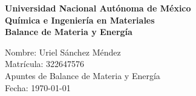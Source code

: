 \documentclass[12pt]{article}
\renewcommand{\headrulewidth}{0pt}
\newcommand{\activarEncabezado}[1]{%
  \fancyhead[L]{\small\textcolor{blueunam}{#1}}%
  \fancyhead[R]{\small\textcolor{blueunam}{\nouppercase{\leftmark}}}%
  \renewcommand{\headrulewidth}{0.4pt}%
  \renewcommand{\headrule}{\hbox to\headwidth{\color{blueunam}\leaders\hrule height \headrulewidth\hfill}}%
}
\begin{document}
\begin{titlepage}
\thispagestyle{empty}
\begin{center}
\vspace*{2cm}
\fontsize{14}{30}\selectfont\textbf{Universidad Nacional Autónoma de México} \\
\vspace{1cm}
\fontsize{14}{30}\selectfont\textbf{Química e Ingeniería en Materiales} \\
\vspace{1cm}
\fontsize{14}{30}\selectfont\textbf{Balance de Materia y Energía} \\
\end{center}
\vspace{2cm}
\begin{flushright}
    \fontsize{14}{30}\selectfont
        \hspace{2cm} Nombre: Uriel Sánchez Méndez \\
        \hspace{2cm} Matrícula: 322647576 \\
        \hspace{2cm} Apuntes de Balance de Materia y Energía \\
        \hspace{2cm} Fecha: \today \\
\end{flushright}
\end{titlepage}

\tableofcontents
\thispagestyle{empty}
\newpage




% 


\end{document}
